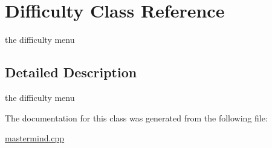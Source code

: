 \hypertarget{class_difficulty}{\section{Difficulty Class Reference}
\label{class_difficulty}
}


the difficulty menu  




\subsection{Detailed Description}
the difficulty menu 

The documentation for this class was generated from the following file\-:\begin{DoxyCompactItemize}
\item 
\hyperlink{mastermind_8cpp}{mastermind.\-cpp}\end{DoxyCompactItemize}
